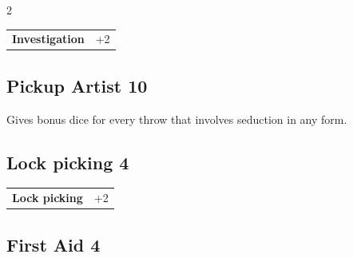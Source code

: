 \begin{multicols}{2}
\begin{tcolorbox}
\vspace{3mm}

\begin{tabular}{@{}ll@{}}
    \textbf{Investigation} & +2\\
\end{tabular}


\end{tcolorbox}

\begin{tcolorbox}
    \subsection*{Pickup Artist \hfill \small{10 }}
    \tcblower
Gives bonus dice for every throw that involves seduction in any form.


\vspace{3mm}



\end{tcolorbox}

\begin{tcolorbox}
    \subsection*{Lock picking \hfill \small{4 }}
    \tcblower




\begin{tabular}{@{}ll@{}}
    \textbf{Lock picking} & +2\\
\end{tabular}


\end{tcolorbox}

\begin{tcolorbox}
    \subsection*{First Aid \hfill \small{4 }}
    \tcblower



\end{tcolorbox}
\end{multicols}
